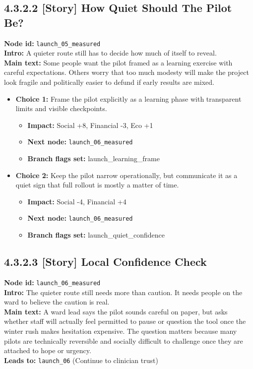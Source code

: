 \documentclass[11pt]{article}
\begin{document}
\subsection*{4.3.2.2 [Story] How Quiet Should The Pilot Be?}
\textbf{Node id:} \texttt{launch\_05\_measured}\\
\textbf{Intro:} A quieter route still has to decide how much of itself to reveal.\\
\textbf{Main text:} Some people want the pilot framed as a learning exercise with careful expectations. Others worry that too much modesty will make the project look fragile and politically easier to defund if early results are mixed.\\
\begin{itemize}
\item \textbf{Choice 1:} Frame the pilot explicitly as a learning phase with transparent limits and visible checkpoints.
\begin{itemize}
\item \textbf{Impact:} Social +8, Financial -3, Eco +1
\item \textbf{Next node:} \texttt{launch\_06\_measured}
\item \textbf{Branch flags set:} launch\_learning\_frame
\end{itemize}
\item \textbf{Choice 2:} Keep the pilot narrow operationally, but communicate it as a quiet sign that full rollout is mostly a matter of time.
\begin{itemize}
\item \textbf{Impact:} Social -4, Financial +4
\item \textbf{Next node:} \texttt{launch\_06\_measured}
\item \textbf{Branch flags set:} launch\_quiet\_confidence
\end{itemize}
\end{itemize}
\subsection*{4.3.2.3 [Story] Local Confidence Check}
\textbf{Node id:} \texttt{launch\_06\_measured}\\
\textbf{Intro:} The quieter route still needs more than caution. It needs people on the ward to believe the caution is real.\\
\textbf{Main text:} A ward lead says the pilot sounds careful on paper, but asks whether staff will actually feel permitted to pause or question the tool once the winter rush makes hesitation expensive. The question matters because many pilots are technically reversible and socially difficult to challenge once they are attached to hope or urgency.\\
\textbf{Leads to:} \texttt{launch\_06} (Continue to clinician trust)\\
\end{document}
